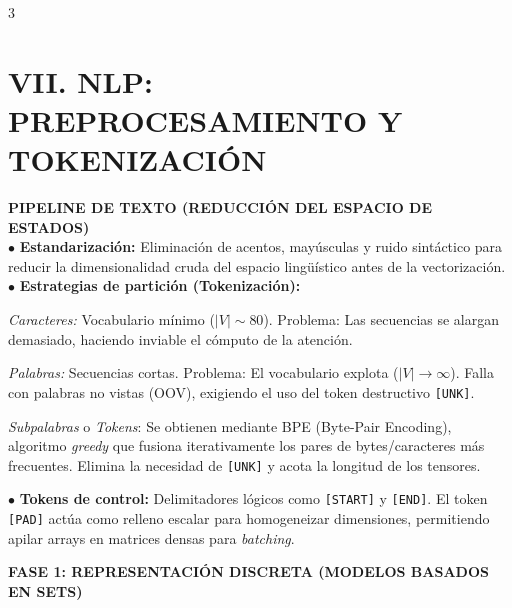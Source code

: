 \documentclass[8pt,a4paper,landscape,fleqn]{extarticle}
\begin{document}
\begin{multicols*}{3}
\begin{center}
\end{center}



\section{VII. NLP: PREPROCESAMIENTO Y TOKENIZACIÓN}
\textbf{PIPELINE DE TEXTO (REDUCCIÓN DEL ESPACIO DE ESTADOS)}\\
$\bullet$ \textbf{Estandarización:} Eliminación de acentos, mayúsculas y ruido sintáctico para reducir la dimensionalidad cruda del espacio lingüístico antes de la vectorización.\\
$\bullet$ \textbf{Estrategias de partición (Tokenización):}

 \textit{Caracteres:} Vocabulario mínimo ($|V| \sim 80$). Problema: Las secuencias se alargan demasiado, haciendo inviable el cómputo de la atención.
 
 \textit{Palabras:} Secuencias cortas. Problema: El vocabulario explota ($|V| \to \infty$). Falla con palabras no vistas (OOV), exigiendo el uso del token destructivo \texttt{[UNK]}.
 
 \textit{Subpalabras} o \textit{Tokens}: Se obtienen mediante BPE (Byte-Pair Encoding), algoritmo \textit{greedy} que fusiona iterativamente los pares de bytes/caracteres más frecuentes. Elimina la necesidad de \texttt{[UNK]} y acota la longitud de los tensores.

$\bullet$ \textbf{Tokens de control:} Delimitadores lógicos como \texttt{[START]} y \texttt{[END]}. El token \texttt{[PAD]} actúa como relleno escalar para homogeneizar dimensiones, permitiendo apilar arrays en matrices densas para \textit{batching}.
  


\textbf{FASE 1: REPRESENTACIÓN DISCRETA (MODELOS BASADOS EN SETS)}\\


\end{multicols*}
\end{document}
